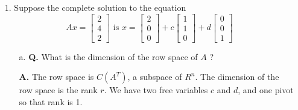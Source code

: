 \documentclass[main.tex]{subfiles}
\begin{document}
\begin{enumerate}
\item [1.] Suppose the complete solution to the equation
$$
A x=\left[\begin{array}{l}
2 \\
4 \\
2
\end{array}\right] \text { is } x=\left[\begin{array}{l}
2 \\
0 \\
0
\end{array}\right]+c\left[\begin{array}{l}
1 \\
1 \\
0
\end{array}\right]+d\left[\begin{array}{l}
0 \\
0 \\
1
\end{array}\right]
$$

\begin{enumerate}
    \item [a.] \textbf{Q.} What is the dimension of the row space of $A$ ? 
    
    \textbf{A.} The row space is $C(A^T)$, a subspace of $R^n$. The dimension of the row space is the rank $r$. We have two free variables $c$ and $d$, and one pivot so that rank is 1.
    

\end{enumerate}
\end{enumerate}
\end{document}
